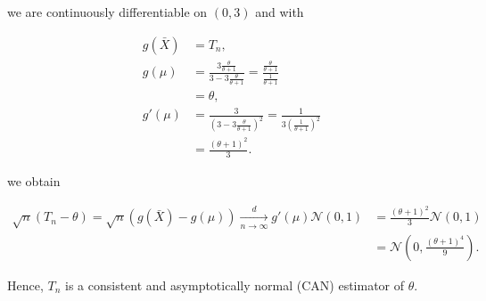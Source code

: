 \begin{solution}
\begin{enumerate}[label=(\alph*)]
  we are continuously differentiable on $(0,3)$ and with

  \begin{align*}
    g(\bar{X}) &= T_n, \\
    g(\mu) &= \frac{3\frac{\theta}{\theta + 1}}{3 - 3\frac{\theta}{\theta + 1}}
    = \frac{\frac{\theta}{\theta + 1}}{\frac{1}{\theta + 1}} \\
    &= \theta, \\
    g'(\mu) &= \frac{3}{(3-3\frac{\theta}{\theta + 1})^2}
    = \frac{1}{3(\frac{1}{\theta + 1})^2} \\
    &= \frac{(\theta + 1)^2}{3}.
  \end{align*}

  we obtain

  \begin{align*}
    \sqrt{n}(T_n - \theta) = \sqrt{n}(g(\bar{X}) - g(\mu)) \xrightarrow[n \to \infty]{d} g'(\mu)\mathcal{N}(0, 1) &= \frac{(\theta + 1)^2}{3} \mathcal{N}(0, 1) \\
    &= \mathcal{N}\left(0, \frac{(\theta + 1)^4}{9}\right).
  \end{align*}

  Hence, $T_n$ is a consistent and asymptotically normal (CAN) estimator of $\theta$.
\end{enumerate}


\end{solution}


